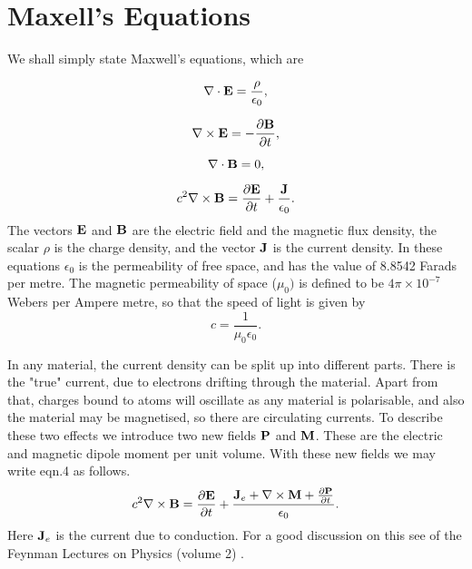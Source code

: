\documentclass[12pt]{article}
\begin{document}
\section{Maxell's Equations}

We shall simply state Maxwell's equations, which  are

\begin{equation}
 \nabla \cdot {\bf E}=\frac{\rho}{\epsilon_0},
\end{equation}

\begin{equation}
\nabla \times {\bf E}=-\frac{\partial {\bf B}}{\partial t},
\end{equation}

\begin{equation}
 \nabla \cdot {\bf B}=0,
\end{equation}

\begin{equation}
c^2 \nabla \times {\bf B}=\frac{\partial {\bf E}}{\partial t} +\frac{{\bf J}}{\epsilon_0}.
\end{equation}
The vectors ${\bf E }$ and ${\bf B}$ are the electric field and the magnetic flux density, the scalar $\rho$ is the charge density, and the vector ${\bf J}$
is the current density. In these equations $\epsilon_0$ is the permeability of free space, and has the value of 8.8542 Farads per metre. The magnetic permeability of space ($\mu_0)$ is defined to be $4 \pi \times 10^{-7}$ Webers per Ampere metre, so that the speed of light is given by
\begin{equation}
c =\frac{1}{ \mu_0 \epsilon_0}.
\end{equation}

In any material, the current density can be split up into different parts.
There is the "true" current, due to electrons drifting through the material.
Apart from that, charges bound to atoms will oscillate as any material is polarisable, and also the material may be magnetised, so there are circulating currents. To describe these two effects we introduce two new fields
 ${\bf P}$ and ${\bf M}$. These are the electric and magnetic dipole moment per unit volume. 
With these new fields we may write eqn.4 as follows.
\begin{equation}
c^2 \nabla \times {\bf B}=\frac{\partial {\bf E}}{\partial t} 
+\frac{
{\bf J}_e + \nabla \times {\bf M}+\frac{\partial {\bf P}}{\partial t}
}{\epsilon_0}.
\end{equation}
Here ${\bf J}_e$ is the current due to conduction. For a good discussion on this
see  of the Feynman Lectures on Physics (volume 2) \cite{FeynLect:Miebib}.
\end{document}
